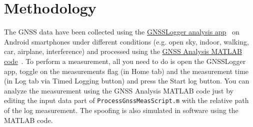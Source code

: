\section{Methodology}
\label{sec:methodology}

The GNSS data have been collected using the \href{https://github.com/google/gps-measurement-tools/releases}{GNSSLogger analysis app}~\cite{GNSS_logger} on Android smartphones under different conditions (e.g. open sky, 
indoor, walking, car, airplane, interference) and processed using the \href{https://github.com/google/gps-measurement-tools/releases}{GNSS Analysis MATLAB code}~\cite{GPS_Measurement_tools}. To perform a measurement, all you need to do is open the GNSSLogger app, toggle on the measurements flag (in Home tab) and the measurement time (in Log tab via Timed Logging button) and press the Start log button. You can analyze the measurement using the GNSS Analysis MATLAB code just by editing the input data part of \texttt{ProcessGnssMeasScript.m} with the relative path of the log measurement. The spoofing is also simulated in software using the MATLAB code. 
